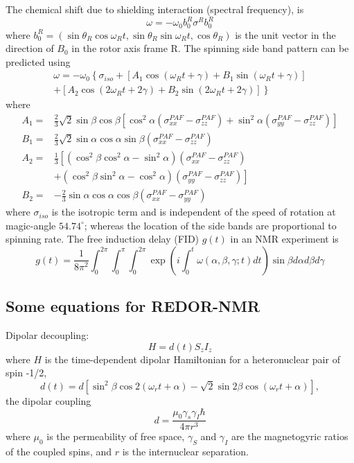 \documentclass[12pt]{book}
\begin{document}
The chemical shift due to shielding interaction (spectral frequency),
is 
\[
\omega=-\omega_{0}b_{0}^{R}\sigma^{R}b_{0}^{R}
\]
where $b_{0}^{R}=\left(\sin\theta_{R}\cos\omega_{R}t,\sin\theta_{R}\sin\omega_{R}t,\cos\theta_{R}\right)$
is the unit vector in the direction of $B_{0}$ in the rotor axis
frame R. The spinning side band pattern can be predicted using 
\begin{multline*}
\omega=-\omega_{0}\left\{ \sigma_{iso}+\left[A_{1}\cos\left(\omega_{R}t+\gamma\right)+B_{1}\sin\left(\omega_{R}t+\gamma\right)\right]\right.\\
\left.+\left[A_{2}\cos\left(2\omega_{R}t+2\gamma\right)+B_{2}\sin\left(2\omega_{R}t+2\gamma\right)\right]\right\} 
\end{multline*}
where
\begin{align*}
A_{1}= & \frac{2}{3}\sqrt{2}\sin\beta\cos\beta\left[\cos^{2}\alpha\left(\sigma_{xx}^{PAF}-\sigma_{zz}^{PAF}\right)+\sin^{2}\alpha\left(\sigma_{yy}^{PAF}-\sigma_{zz}^{PAF}\right)\right]\\
B_{1}= & \frac{2}{3}\sqrt{2}\sin\alpha\cos\alpha\sin\beta\left(\sigma_{xx}^{PAF}-\sigma_{zz}^{PAF}\right)\\
A_{2}= & \frac{1}{3}\left[\left(\cos^{2}\beta\cos^{2}\alpha-\sin^{2}\alpha\right)\left(\sigma_{xx}^{PAF}-\sigma_{zz}^{PAF}\right)\right.\\
& +\left.\left(\cos^{2}\beta\sin^{2}\alpha-\cos^{2}\alpha\right)\left(\sigma_{yy}^{PAF}-\sigma_{zz}^{PAF}\right)\right]\\
B_{2}= & -\frac{2}{3}\sin\alpha\cos\alpha\cos\beta\left(\sigma_{xx}^{PAF}-\sigma_{yy}^{PAF}\right)
\end{align*}
where $\sigma_{iso}$ is the isotropic term and is independent of
the speed of rotation at magic-angle $54.74^{\circ}$; whereas the
location of the side bands are proportional to spinning rate. The
free induction delay (FID) $g\left(t\right)$ in an NMR experiment
is 
\[
g\left(t\right)=\frac{1}{8\pi^{2}}\int_{0}^{2\pi}\int_{0}^{\pi}\int_{0}^{2\pi}\exp\left(i\int_{0}^{t}\omega\left(\alpha,\beta,\gamma;t\right)dt\right)\sin\beta d\alpha d\beta d\gamma
\]


\subsection{Some equations for REDOR-NMR}

Dipolar decoupling: 
\[
H=d\left(t\right)S_{z}I_{z}
\]
where $H$ is the time-dependent dipolar Hamiltonian for a heteronuclear
pair of spin -1/2, 
\[
d\left(t\right)=d\left[\sin^{2}\beta\cos2\left(\omega_{r}t+\alpha\right)-\sqrt{2}\sin2\beta\cos\left(\omega_{r}t+\alpha\right)\right],
\]
the dipolar coupling 
\[
d=\frac{\mu_{0}\gamma_{s}\gamma_{I}\hbar}{4\pi r^{3}}
\]
where $\mu_{0}$ is the permeability of free space, $\gamma_{S}$
and $\gamma_{I}$ are the magnetogyric ratios of the coupled spins,
and $r$ is the internuclear separation. 
\end{document}

